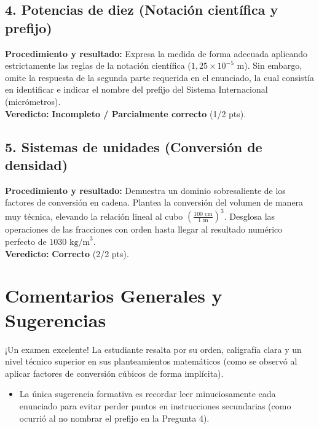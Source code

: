 \documentclass[12pt]{article}
\begin{document}
\subsection*{4. Potencias de diez (Notación científica y prefijo)}
\textbf{Procedimiento y resultado:} Expresa la medida de forma adecuada aplicando estrictamente las reglas de la notación científica ($1,25 \times 10^{-5}$ m). Sin embargo, omite la respuesta de la segunda parte requerida en el enunciado, la cual consistía en identificar e indicar el nombre del prefijo del Sistema Internacional (micrómetros). \\
\textbf{Veredicto:} \textbf{Incompleto / Parcialmente correcto} (1/2 pts).

\subsection*{5. Sistemas de unidades (Conversión de densidad)}
\textbf{Procedimiento y resultado:} Demuestra un dominio sobresaliente de los factores de conversión en cadena. Plantea la conversión del volumen de manera muy técnica, elevando la relación lineal al cubo $\left(\frac{100 \text{ cm}}{1 \text{ m}}\right)^3$. Desglosa las operaciones de las fracciones con orden hasta llegar al resultado numérico perfecto de $1030 \text{ kg/m}^3$. \\
\textbf{Veredicto:} \textbf{Correcto} (2/2 pts).

\vspace{0.5cm}
\section*{Comentarios Generales y Sugerencias}
¡Un examen excelente! La estudiante resalta por su orden, caligrafía clara y un nivel técnico superior en sus planteamientos matemáticos (como se observó al aplicar factores de conversión cúbicos de forma implícita).
\begin{itemize}
    \item La única sugerencia formativa es recordar leer minuciosamente cada enunciado para evitar perder puntos en instrucciones secundarias (como ocurrió al no nombrar el prefijo en la Pregunta 4).
\end{itemize}
\end{document}
